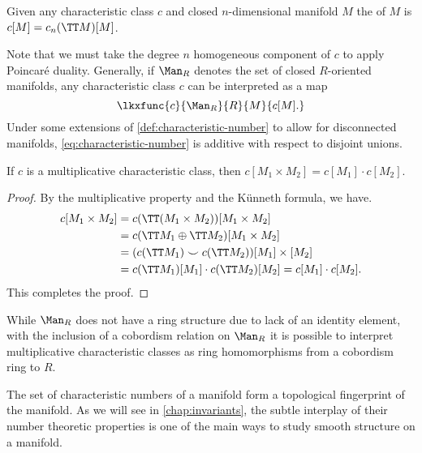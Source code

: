 \begin{definition}\label{def:characteristic-number}
	Given any characteristic class $c$ and closed $n$-dimensional manifold $M$ the  of $M$ is $c[M] = c_n(\TT M)[M]$.
\end{definition}

Note that we must take the degree $n$ homogeneous component of $c$ to apply Poincar\'e duality. Generally, if $\Man_R$ denotes the set of closed $R$-oriented manifolds, any characteristic class $c$ can be interpreted as a map
\begin{equation}\label{eq:characteristic-number}
	\lkxfunc{c}{\Man_R}{R}{M}{c[M].}
\end{equation}
Under some extensions of \cref{def:characteristic-number} to allow for disconnected manifolds, \cref{eq:characteristic-number} is additive with respect to disjoint unions.
\begin{proposition}
	If $c$ is a multiplicative characteristic class, then $c[M_1\times M_2]=c[M_1]\cdot c[M_2]$.
\end{proposition}
\begin{proof}
	By the multiplicative property and the K\"unneth formula, we have.
	\[
		\begin{aligned}
			c[M_1\times M_2]
			 & = c(\TT (M_1\times M_2))[M_1\times M_2]                      \\
			 & = c(\TT M_1\oplus \TT M_2)[M_1\times M_2]                    \\
			 & = (c(\TT M_1)\smile c(\TT M_2))[M_1]\times [M_2]             \\
			 & = c(\TT M_1)[M_1]\cdot c(\TT M_2)[M_2] = c[M_1]\cdot c[M_2].
		\end{aligned}
	\]
	This completes the proof.
\end{proof}

\begin{remark}
	While $\Man_R$ does not have a ring structure due to lack of an identity element, with the inclusion of a cobordism relation on $\Man_R$ it is possible to interpret multiplicative characteristic classes as ring homomorphisms from a cobordism ring to $R$.
\end{remark}

The set of characteristic numbers of a manifold form a topological fingerprint of the manifold. As we will see in \cref{chap:invariants}, the subtle interplay of their number theoretic properties is one of the main ways to study smooth structure on a manifold.

